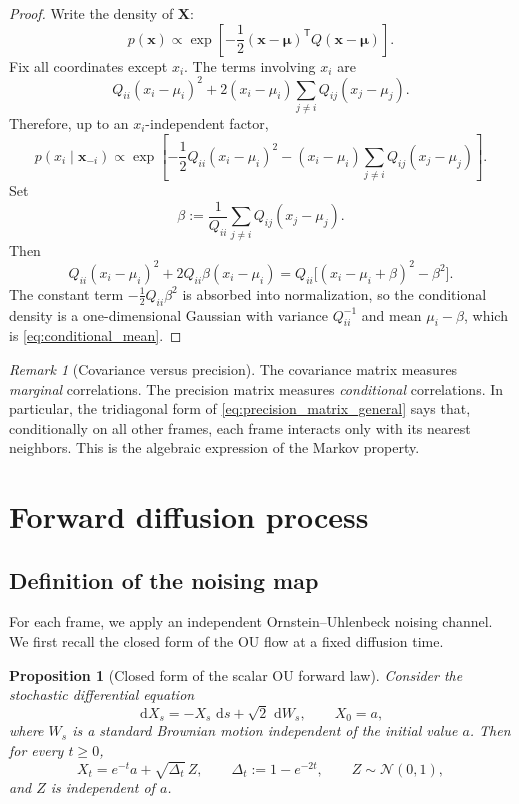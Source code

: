 \documentclass[11pt]{article}
\numberwithin{equation}{section}
\newtheorem{proposition}[theorem]{Proposition}
\theoremstyle{definition}
\theoremstyle{remark}
\newtheorem{remark}[theorem]{Remark}
\newcommand{\trans}{\mathsf{T}}
\newcommand{\diff}{\,\mathrm{d}}
\newcommand{\Ncal}{\mathcal{N}}
\begin{document}
\begin{proof}
Write the density of $\mathbf X$:
\[
p(\mathbf x)\propto \exp\!\left[-\frac12(\mathbf x-\boldsymbol{\mu})^\trans Q(\mathbf x-\boldsymbol{\mu})\right].
\]
Fix all coordinates except $x_i$. The terms involving $x_i$ are
\[
Q_{ii}(x_i-\mu_i)^2 + 2(x_i-\mu_i)\sum_{j\neq i}Q_{ij}(x_j-\mu_j).
\]
Therefore, up to an $x_i$-independent factor,
\[
p(x_i\mid \mathbf x_{-i})
\propto
\exp\!\left[
-\frac12Q_{ii}(x_i-\mu_i)^2
-(x_i-\mu_i)\sum_{j\neq i}Q_{ij}(x_j-\mu_j)
\right].
\]
Set
\[
\beta:=\frac{1}{Q_{ii}}\sum_{j\neq i}Q_{ij}(x_j-\mu_j).
\]
Then
\[
Q_{ii}(x_i-\mu_i)^2+2Q_{ii}\beta(x_i-\mu_i)
=
Q_{ii}\big[(x_i-\mu_i+\beta)^2-\beta^2\big].
\]
The constant term $-\frac12Q_{ii}\beta^2$ is absorbed into normalization, so the conditional density is a one-dimensional Gaussian with variance $Q_{ii}^{-1}$ and mean $\mu_i-\beta$, which is \eqref{eq:conditional_mean}.
\end{proof}

\begin{remark}[Covariance versus precision]
The covariance matrix measures \emph{marginal} correlations. The precision matrix measures \emph{conditional} correlations. In particular, the tridiagonal form of \eqref{eq:precision_matrix_general} says that, conditionally on all other frames, each frame interacts only with its nearest neighbors. This is the algebraic expression of the Markov property.
\end{remark}

\section{Forward diffusion process}\label{sec:forward}

\subsection{Definition of the noising map}

For each frame, we apply an independent Ornstein--Uhlenbeck noising channel. We first recall the closed form of the OU flow at a fixed diffusion time.

\begin{proposition}[Closed form of the scalar OU forward law]\label{prop:ou}
Consider the stochastic differential equation
\begin{equation}\label{eq:ou_sde}
\diff X_s = -X_s\,\diff s + \sqrt{2}\,\diff W_s,
\qquad
X_0=a,
\end{equation}
where $W_s$ is a standard Brownian motion independent of the initial value $a$. Then for every $t\geq 0$,
\begin{equation}\label{eq:ou_closed}
X_t=e^{-t}a+\sqrt{\Delta_t}\,Z,
\qquad
\Delta_t:=1-e^{-2t},
\qquad
Z\sim\Ncal(0,1),
\end{equation}
and $Z$ is independent of $a$.
\end{proposition}
\end{document}
